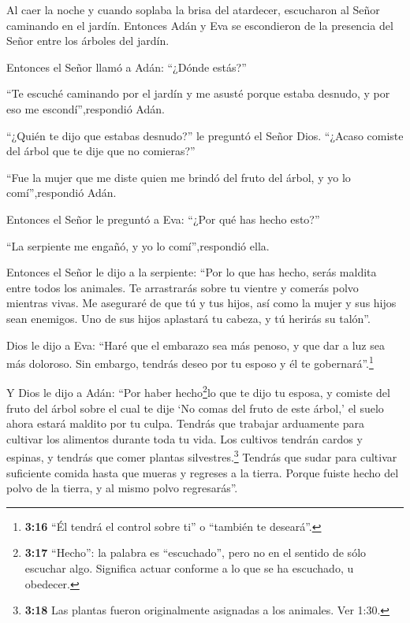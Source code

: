  Al caer la noche y cuando soplaba la brisa del atardecer,
escucharon al Señor caminando en el jardín. Entonces Adán y Eva se
escondieron de la presencia del Señor entre los árboles del jardín.

 Entonces el Señor llamó a Adán: ``¿Dónde estás?''

 ``Te escuché caminando por el jardín y me asusté porque
estaba desnudo, y por eso me escondí'',respondió Adán.

 ``¿Quién te dijo que estabas desnudo?'' le preguntó el
Señor Dios. ``¿Acaso comiste del árbol que te dije que no comieras?''

 ``Fue la mujer que me diste quien me brindó del fruto del
árbol, y yo lo comí'',respondió Adán.

 Entonces el Señor le preguntó a Eva: ``¿Por qué has hecho
esto?''

``La serpiente me engañó, y yo lo comí'',respondió ella.

 Entonces el Señor le dijo a la serpiente: ``Por lo que has
hecho, serás maldita entre todos los animales. Te arrastrarás sobre tu
vientre y comerás polvo mientras vivas.  Me aseguraré de
que tú y tus hijos, así como la mujer y sus hijos sean enemigos. Uno de
sus hijos aplastará tu cabeza, y tú herirás su talón''.

 Dios le dijo a Eva: ``Haré que el embarazo sea más penoso,
y que dar a luz sea más doloroso. Sin embargo, tendrás deseo por tu
esposo y él te gobernará''.\footnote{\textbf{3:16} ``Él tendrá el
  control sobre ti'' o ``también te deseará''.}

 Y Dios le dijo a Adán: ``Por haber hecho\footnote{\textbf{3:17}
  ``Hecho'': la palabra es ``escuchado'', pero no en el sentido de sólo
  escuchar algo. Significa actuar conforme a lo que se ha escuchado, u
  obedecer.}lo que te dijo tu esposa, y comiste del fruto del árbol
sobre el cual te dije `No comas del fruto de este árbol,' el suelo ahora
estará maldito por tu culpa. Tendrás que trabajar arduamente para
cultivar los alimentos durante toda tu vida.  Los cultivos
tendrán cardos y espinas, y tendrás que comer plantas
silvestres.\footnote{\textbf{3:18} Las plantas fueron originalmente
  asignadas a los animales. Ver 1:30.}  Tendrás que sudar
para cultivar suficiente comida hasta que mueras y regreses a la tierra.
Porque fuiste hecho del polvo de la tierra, y al mismo polvo
regresarás''.

